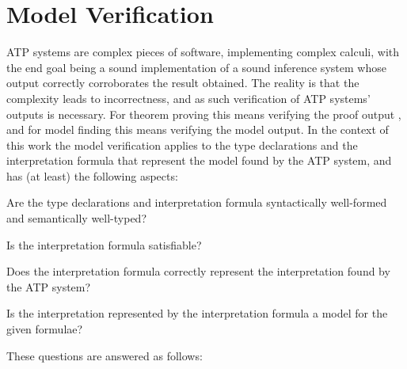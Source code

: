 \documentclass{easychair}
\newenvironment{packed_enumerate}{
\vspace*{-0.2em}
\begin{enumerate}
\setlength{\partopsep}{0pt}
\setlength{\itemsep}{1pt}
\setlength{\parskip}{0pt}
\setlength{\parsep}{0pt}
}{\end{enumerate}}
\begin{document}
\section{Model Verification}
\label{Verification}

ATP systems are complex pieces of software, implementing complex calculi, with the end goal
being a sound implementation of a sound inference system whose output correctly corroborates the
result obtained.
The reality is that the complexity leads to incorrectness, and as such verification of ATP systems'
outputs is necessary. 
For theorem proving this means verifying the proof output \cite{Sut06}, and for model finding 
this means verifying the model output.
In the context of this work the model verification applies to the type declarations and 
the interpretation formula that represent the model found by the ATP system, and
has (at least) the following aspects:
\begin{packed_enumerate}
\item Are the type declarations and interpretation formula syntactically well-formed 
      and semantically well-typed?
\item Is the interpretation formula satisfiable?
\item Does the interpretation formula correctly represent the interpretation found by the 
      ATP system?
\item Is the interpretation represented by the interpretation formula a model for the given 
      formulae?
\end{packed_enumerate}
\noindent
These questions are answered as follows:
\end{document}
